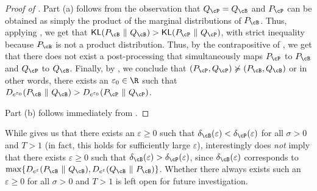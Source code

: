 \documentclass[twoside]{article}
\theoremstyle{definition}
\newcommand{\eps}{\varepsilon}
\newcommand{\Deps}{D_{e^{\eps}}}
\newcommand{\KL}{\mathsf{KL}}
\newcommand{\deltaP}{\delta_{\cP}}
\newcommand{\deltaB}{\delta_{\cB}}
\newcommand{\PB}{P_{\cB}}
\newcommand{\QB}{Q_{\cB}}
\newcommand{\PP}{P_{\cP}}
\newcommand{\QP}{Q_{\cP}}
\newcommand{\dominates}{\succcurlyeq}%
\begin{document}
\begin{proof}[Proof of ]
Part (a) follows from the observation that $\QP = \QB$ and $\PP$ can be obtained as simply the product of the marginal distributions of $\PB$. Thus, applying , we get that $\KL(\PB ~\|~ \QB) > \KL(\PP ~\|~ \QP)$, with strict inequality because $\PB$ is not a product distribution. Thus, by the contrapositive of , we get that there does not exist a post-processing that simultaneously maps $\PP$ to $\PB$ and $\QP$ to $\QB$. Finally, by , we conclude that $(\PP, \QP) \not\dominates (\PB, \QB)$ or in other words, there exists an $\eps_0 \in \R$ such that $D_{e^{\eps_0}}(\PB ~\|~ \QB) > D_{e^{\eps_0}}(\PP ~\|~ \QP)$.

Part (b) follows immediately from .
\end{proof}

While  gives us that there exists an $\eps \ge 0$ such that $\deltaB(\eps) < \deltaP(\eps)$ for all $\sigma > 0$ and $T > 1$ (in fact, this holds for sufficiently large $\eps$), interestingly  does {\em  not} imply that there exists $\eps \ge 0$ such that $\deltaB(\eps) > \deltaP(\eps)$, since $\deltaB(\eps)$ corresponds to $\max\{\Deps(\PB ~\|~ \QB), \Deps(\QB ~\|~ \PB)\}$. Whether there always exists such an $\eps \ge 0$ for all $\sigma > 0$ and $T > 1$ is left open for future investigation.

\vfill %
\end{document}
